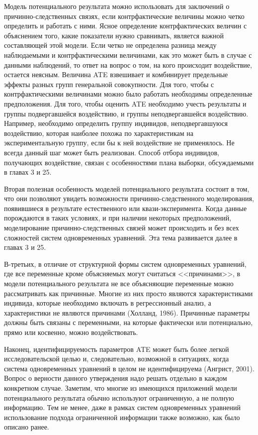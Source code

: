 	
Модель потенциального результата можно использовать для заключений о причинно-следственных связях, если контрфактические величины можно четко определить и работать с ними.
Ясное определение контрфактических величин с объяснением того, какие показатели нужно сравнивать, является важной составляющей этой модели. Если четко не определена разница  между наблюдаемыми и контрфактическими величинами,  как это может быть в случае с данными наблюдений, то ответ на вопрос о том, на кого происходит воздействие, остается неясным. 
Величина ATE взвешивает и комбинирует предельные эффекты разных групп генеральной совокупности. Для того, чтобы с контрфактическими величинами можно было работать необходимы определенные предположения. Для того, чтобы оценить ATE необходимо учесть результаты и группы подвергавшейся воздействию, и группы неподвергавшейся воздействию.
Например, необходимо определить группу индивидов, неподвергавшуюся воздействию, которая наиболее похожа по характеристикам на экспериментальную группу, если бы к ней воздействие не применялось. Не всегда данный шаг может быть реализован.
Способ отбора индивидов, получающих воздействие, связан с особенностями плана выборки, обсуждаемыми в главах 3 и 25.

	
	
Вторая полезная особенность моделей потенциального результата состоит в том, что они позволяют увидеть  возможности причинно-следственного моделирования, появившиеся в результате естественного или квази-эксперимента. Когда данные порождаются в таких условиях, и при наличии некоторых предположений,  моделирование причинно-следственных связей  может происходить и без всех сложностей систем одновременных уравнений. Эта тема развивается далее в главах 3 и 25.

В-третьих, в отличие от структурной формы систем одновременных уравнений, где все переменные кроме объясняемых могут считаться <<причинами>>, в модели потенциального результата не все объясняющие переменные можно рассматривать как причинные. Многие из них просто являются характеристиками индивида, которые необходимо включать в регрессионный анализ, а характеристики не являются причинами (Холланд, 1986). Причинные параметры должны быть связаны с переменными, на которые фактически или потенциально, прямо или косвенно, можно воздействовать.
	
	
Наконец, идентифицируемость  параметров ATE может быть более легкой исследовательской целью  и, следовательно, возможной в ситуациях, когда  система одновременных уравнений в целом не идентифицируема (Ангрист, 2001). Вопрос о верности данного утверждения надо решать отдельно в каждом конкретном случае. Заметим, что многие из имеющихся приложений модели потенциального результата обычно используют ограниченную, а не полную информацию. Тем не менее, даже в рамках систем одновременных уравнений использование подхода ограниченной информации также возможно, как было описано ранее.


